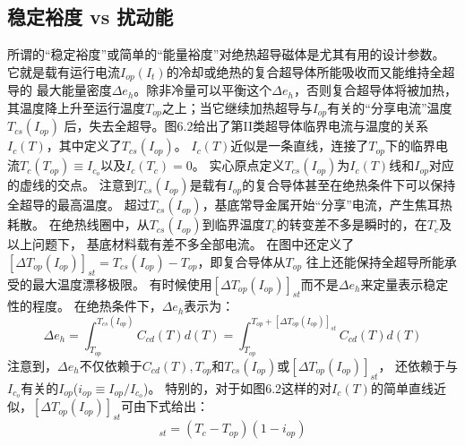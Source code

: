 \subsection{稳定裕度 vs 扰动能}
所谓的“稳定裕度”或简单的“能量裕度”对绝热超导磁体是尤其有用的设计参数。
它就是载有运行电流$I_{op}(I_t)$的冷却或绝热的复合超导体所能吸收而又能维持全超导的
最大能量密度$\Delta e_h$。除非冷量可以平衡这个$\Delta e_h$，否则复合超导体将被加热，
其温度降上升至运行温度$T_{op}$之上；当它继续加热超导与$I_{op}$有关的“分享电流”温度$T_{cs}(I_{op})$
后，失去全超导。图6.2给出了第II类超导体临界电流与温度的关系$I_c(T)$，其中定义了$T_{cs}(I_{op})$。
$I_c(T)$近似是一条直线，连接了$T_{op}$下的临界电流$T_c(T_{op})\equiv I_{c_o}$以及$I_c(T_c)=0$。
实心原点定义$T_{cs}(I_{op})$为$I_c(T)$线和$I_{op}$对应的虚线的交点。
注意到$T_{cs}(I_{op})$是载有$I_{op}$的复合导体甚至在绝热条件下可以保持全超导的最高温度。
超过$T_{cs}(I_{op})$，基底常导金属开始“分享”电流，产生焦耳热耗散。
在绝热线圈中，从$T_{cs}(I_{op})$到临界温度$T_c$的转变差不多是瞬时的，在$T_c$及以上问题下，
基底材料载有差不多全部电流。
在图中还定义了$[\Delta T_{op}(I_{op})]_{st}=T_{cs}(I_{op})-T_{op}$，即复合导体从$T_{op}$
往上还能保持全超导所能承受的最大温度漂移极限。
有时候使用$[\Delta T_{op}(I_{op})]_{st}$而不是$\Delta e_h$来定量表示稳定性的程度。
在绝热条件下，$\Delta e_h$表示为： 
\begin{equation}%
\Delta e_h=\int_{T_{op}}^{T_{cs}(I_{op})}{C_{cd}(T)d(T)}=\int_{T_{op}}^{T_{op}+[\Delta T_{op}(I_{op})]_{st}}{C_{cd}(T)d(T)}
\end{equation}
注意到，$\Delta e_h$不仅依赖于$C_{cd}(T),T_{op}$和$T_{cs}(I_{op})$或$[\Delta T_{op}(I_{op})]_{st}$，
还依赖于与$I_{c_o}$有关的$I_{op}$($i_{op}\equiv I_{op}/I_{c_o}$)。
特别的，对于如图6.2这样的对$I_c(T)$的简单直线近似，$[\Delta T_{op}(I_{op})]_{st}$可由下式给出：
\begin{equation}%
[\Delta T_{op}(I_{op})]_{st}=(T_c-T_{op})(1-i_{op})
\end{equation}
